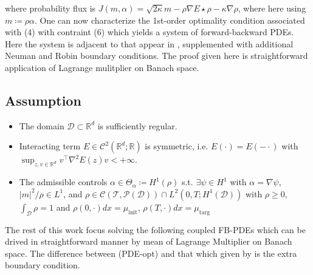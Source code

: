 \documentclass[10pt,a4paper]{article}
\begin{document}
where probability flux is $\displaystyle J( m,\alpha ) =\sqrt{2\kappa } m-\rho \nabla E\star \rho -\kappa \nabla \rho $, where here using $\displaystyle m\coloneq \rho \alpha $. One can now characterize the 1st-order optimality condition associated with (4) with contraint (6) which yields a system of forward-backward PDEs. Here the system is adjacent to that appear in \cite{}, supplemented with additional Neuman and Robin boundary conditions. The proof given here is straightforward application of Lagrange mulitplier on Banach space. 



\subsection{Assumption}
\begin{itemize}
\item The domain $\displaystyle \mathcal{D} \subset \mathbb{R}^{d}$ is sufficiently regular. 
\item Interacting term $\displaystyle E\in \mathcal{C}^{2}\left(\mathbb{R}^{d} ;\mathbb{R}\right)$ is symmetric, i.e. $\displaystyle E( \cdot ) =E( -\cdot )$ with $\displaystyle \sup\nolimits _{z,v\in \mathbb{R}^{d}} v^{\top } \nabla ^{2} E( z) v< +\infty $. 
\item The admissible controls $\displaystyle \alpha \in \Theta _{\alpha } \coloneq H^{1}( \rho )$ s.t. $\displaystyle \exists \psi \in H^{1}$ with $\displaystyle \alpha =\nabla \psi $, $\displaystyle | m| ^{2} /\rho \in L^{1}$, and $\displaystyle \rho \in \mathcal{C}\left(\mathcal{T} ,\mathscr{P}(\mathcal{D})\right) \cap L^{2}\left( 0,T;H^{1}(\mathcal{D})\right)$ with $\displaystyle \rho \geqslant 0$, $\displaystyle {\textstyle \int _{\mathcal{D}} \rho =1}$ and $\displaystyle \rho ( 0,\cdot ) dx=\mu _{\text{init}}$, $\displaystyle \rho ( T,\cdot ) dx=\mu _{\text{targ}}$
\end{itemize}

The rest of this work focus solving the following coupled FB-PDEs which can be drived in straightforward manner by mean of Lagrange Multiplier on Banach space. The difference between (PDE-opt) and that which given by \cite{Backhoff2020MeanFieldErgodic} is the extra boundary condition.
\end{document}
